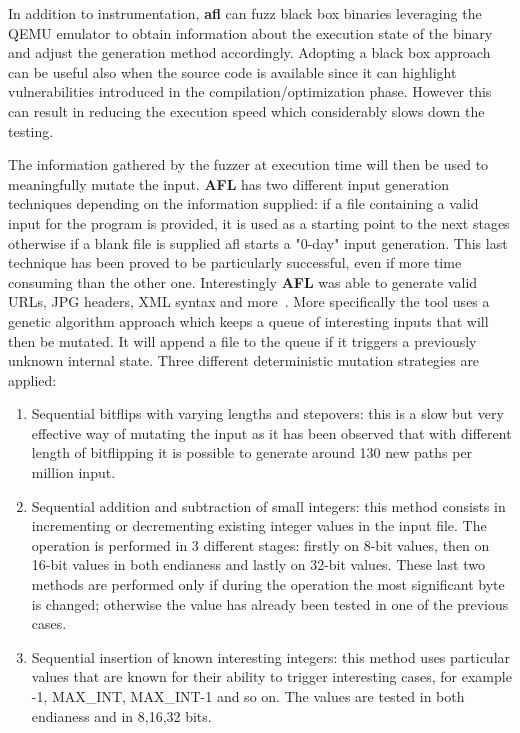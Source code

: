 \documentclass[../main.tex]{subfiles}
\begin{document}
In addition to instrumentation, \textbf{\acrshort{afl}} can fuzz black box binaries leveraging the QEMU emulator to obtain information about the execution state of the binary and adjust the generation method accordingly. Adopting a black box approach can be useful also when the source code is available since it can highlight vulnerabilities introduced in the compilation/optimization phase. However this can result in reducing the execution speed which considerably slows down the testing.

The information gathered by the fuzzer at execution time will then be used to meaningfully mutate the input. \textbf{AFL} has two different input generation techniques depending on the information supplied: if a file containing a valid input for the program is provided, it is used as a starting point to the next stages otherwise if a blank file is supplied afl starts a "0-day" input generation. This last technique has been proved to be particularly successful, even if more time consuming than the other one. Interestingly \textbf{AFL} was able to generate valid URLs, JPG headers, XML syntax and more~\cite{aflblog}. More specifically the tool uses a genetic algorithm approach which keeps a queue of interesting inputs that will then be mutated. It will append a file to the queue if it triggers a previously unknown internal state. Three different deterministic mutation strategies are applied:
\begin{enumerate}
  \item Sequential bitflips with varying lengths and stepovers: this is a slow but very effective way of mutating the input as it has been observed that with different length of bitflipping it is possible to generate around 130 new paths per million input.
  \item Sequential addition and subtraction of small integers: this method consists in incrementing or decrementing existing integer values in the input file. The operation is performed in 3 different stages: firstly on 8-bit values, then on 16-bit values in both endianess and lastly on 32-bit values. These last two methods are performed only if during the operation the most significant byte is changed; otherwise the value has already been tested in one of the previous cases.
  \item Sequential insertion of known interesting integers: this method uses particular values that are known for their ability to trigger interesting cases, for example -1, MAX\_INT, MAX\_INT-1 and so on. The values are tested in both endianess and in 8,16,32 bits.
\end{enumerate}
\end{document}
